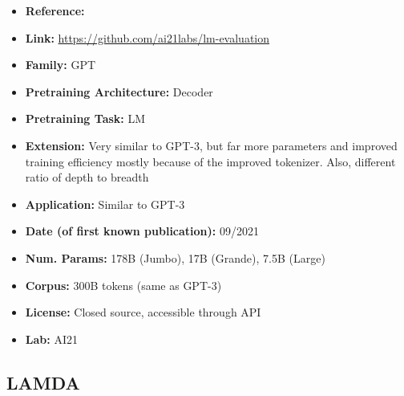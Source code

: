 \documentclass{article}
\begin{document}
            \begin{itemize}
                \item \textbf{Reference:} \href{https://uploads-ssl.webflow.com/60fd4503684b466578c0d307/61138924626a6981ee09caf6_jurassic_tech_paper.pdf}{}
                \item \textbf{Link:} \url{https://github.com/ai21labs/lm-evaluation}
                \item \textbf{Family:} GPT 
                \item \textbf{Pretraining Architecture:} Decoder
                \item \textbf{Pretraining Task:} LM
                \item \textbf{Extension:} Very similar to GPT-3, but far more parameters and improved training efficiency mostly because of the improved tokenizer. Also, different ratio of depth to breadth  
                \item \textbf{Application:} Similar to GPT-3
                \item \textbf{Date (of first known publication):} 09/2021
                \item \textbf{Num. Params:} 178B (Jumbo), 17B (Grande), 7.5B (Large)
                \item \textbf{Corpus:} 300B tokens (same as GPT-3)
                \item \textbf{License:} Closed source, accessible through API
                \item \textbf{Lab:} AI21
            \end{itemize}
            
\subsection{LAMDA}
\end{document}
